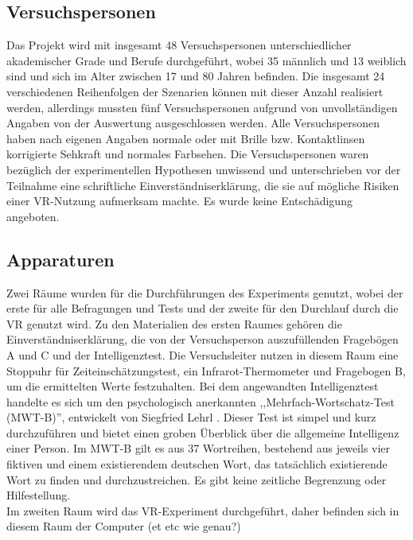 \documentclass{Paper}
\begin{document}
\subsection{Versuchspersonen}

Das Projekt wird mit insgesamt 48 Versuchspersonen unterschiedlicher akademischer Grade und Berufe  durchgeführt, wobei 35 männlich und 13 weiblich sind und sich im Alter zwischen 17 und 80 Jahren befinden. 
Die insgesamt 24 verschiedenen Reihenfolgen der Szenarien können mit dieser Anzahl realisiert werden, allerdings mussten fünf Versuchspersonen aufgrund von unvollständigen Angaben von der Auswertung ausgeschlossen werden. 
Alle Versuchspersonen haben nach eigenen Angaben normale oder mit Brille bzw. Kontaktlinsen korrigierte Sehkraft und normales Farbsehen. Die Versuchspersonen waren bezüglich der experimentellen Hypothesen unwissend und unterschrieben vor der Teilnahme eine schriftliche Einverständniserklärung, die sie auf mögliche Risiken einer VR-Nutzung aufmerksam machte. Es wurde keine Entschädigung angeboten. 

        \subsection{Apparaturen}
Zwei Räume wurden für die Durchführungen des Experiments genutzt, wobei der erste für alle Befragungen und Tests und der zweite für den Durchlauf durch die VR genutzt wird.
Zu den Materialien des ersten Raumes gehören die Einverständniserklärung, die von der Versuchsperson auszufüllenden Fragebögen A und C und der Intelligenztest. 
Die Versuchsleiter nutzen in diesem Raum eine Stoppuhr für Zeiteinschätzungstest, ein Infrarot-Thermometer und Fragebogen B, um die ermittelten Werte festzuhalten.
Bei dem angewandten Intelligenztest handelte es sich um den psychologisch anerkannten ,,Mehrfach-Wortschatz-Test (MWT-B)'', entwickelt von Siegfried Lehrl \cite{MWT-B}. Dieser Test ist simpel und kurz durchzuführen und bietet einen groben Überblick über die allgemeine Intelligenz einer Person. 
Im MWT-B gilt es aus 37 Wortreihen, bestehend aus jeweils vier fiktiven und einem existierendem deutschen Wort, das tatsächlich existierende Wort zu finden und durchzustreichen. Es gibt keine zeitliche Begrenzung oder Hilfestellung.\\
Im zweiten Raum wird das VR-Experiment durchgeführt, daher befinden sich in diesem Raum der Computer (et etc wie genau?) 

\end{document}
